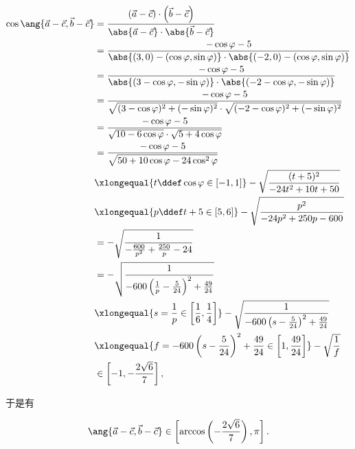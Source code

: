 \documentclass[8pt]{article}
\begin{document}
\begin{easonbigproblem}
			\begin{align}
				\cos \ang{\vec{a} - \vec{c}, \vec{b} - \vec{c}} &= \frac{\left(\vec{a} - \vec{c}\right) \cdot \left(\vec{b} - \vec{c}\right)}{\abs{\vec{a} - \vec{c}} \cdot \abs{\vec{b} - \vec{c}}}\\
				&= \frac{- \cos \varphi - 5}{\abs{(3, 0) - (\cos \varphi, \sin \varphi)} \cdot \abs{(-2, 0) - (\cos \varphi, \sin \varphi)}}\\
				&= \frac{- \cos \varphi - 5}{\abs{(3 - \cos \varphi, - \sin \varphi)} \cdot \abs{(-2 - \cos \varphi, - \sin \varphi)}}\\
				&= \frac{- \cos \varphi - 5}{\sqrt{(3 - \cos \varphi)^2 + (- \sin \varphi)^2} \cdot \sqrt{(-2 - \cos \varphi)^2 + (- \sin \varphi)^2}}\\
				&= \frac{- \cos \varphi - 5}{\sqrt{10 - 6 \cos \varphi} \cdot \sqrt{5 + 4 \cos \varphi}}\\
				&= \frac{- \cos \varphi - 5}{\sqrt{50 + 10 \cos \varphi - 24 \cos^2 \varphi}}\\
				&\xlongequal{t\ddef \cos \varphi  \in [-1, 1]} - \sqrt{\frac{(t + 5)^2}{-24 t^2 + 10t + 50}}\\
				&\xlongequal{p\ddef t+5 \in [5, 6]} - \sqrt{\frac{p^2}{- 24p^2 + 250p - 600}}\\
				&= -\sqrt{\frac{1}{-\frac{600}{p^2} + \frac{250}{p} - 24}}\\
				&= -\sqrt{\frac{1}{-600 \left(\frac{1}{p} - \frac{5}{24}\right)^2 + \frac{49}{24}}}\\
				&\xlongequal{s=\frac{1}{p} \in \left[\frac{1}{6}, \frac{1}{4}\right]} - \sqrt{\frac{1}{-600 \left(s - \frac{5}{24}\right)^2 + \frac{49}{24}}}\\
				&\xlongequal{f=-600 \left(s - \frac{5}{24}\right)^2 + \frac{49}{24} \in \left[1, \frac{49}{24}\right]} -\sqrt{\frac{1}{f}}\\
				&\in \left[-1, -\frac{2\sqrt{6}}{7}\right],
			\end{align}

			于是有

			\begin{displaymath}
				\ang{\vec{a} - \vec{c}, \vec{b} - \vec{c}} \in \left[\arccos \left(-\frac{2\sqrt{6}}{7}\right), \pi\right].
			\end{displaymath}

			\begin{center}
			\end{center}


\end{easonbigproblem}
\end{document}
